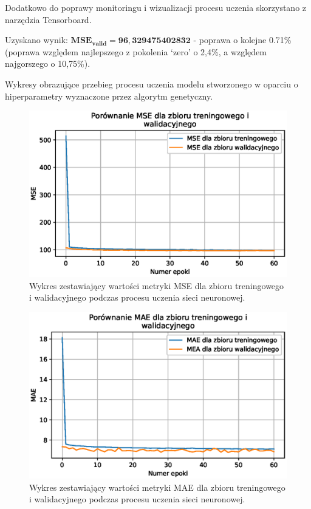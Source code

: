 \documentclass[a4paper,12pt]{article}
\numberwithin{figure}{section}
\begin{document}
    \bigskip

    Dodatkowo do poprawy monitoringu i wizualizacji procesu uczenia skorzystano z narzędzia Tensorboard.

    \bigskip

    Uzyskano wynik: $\bm{MSE_{valid} = 96,329475402832}$ - poprawa o kolejne 0.71\% (poprawa względem najlepszego z pokolenia `zero' o 2,4\%, a względem najgorszego o 10,75\%).

    \bigskip

    Wykresy obrazujące przebieg procesu uczenia modelu stworzonego w oparciu o hiperparametry wyznaczone przez algorytm genetyczny.

    \bigskip

    \begin{figure}[H]
        \centering
        \includegraphics[width=\textwidth]{f_m_mse_train_valid}
        \caption{Wykres zestawiający wartości metryki MSE dla zbioru treningowego i walidacyjnego podczas procesu uczenia sieci neuronowej.}
        \label{fig:f_m_mse_train_valid}
    \end{figure}

    \smallskip

    \begin{figure}[H]
        \centering
        \includegraphics[width=\textwidth]{f_m_mae_train_valid}
        \caption{Wykres zestawiający wartości metryki MAE dla zbioru treningowego i walidacyjnego podczas procesu uczenia sieci neuronowej.}
        \label{fig:f_m_mae_train_valid}
    \end{figure}
\end{document}
